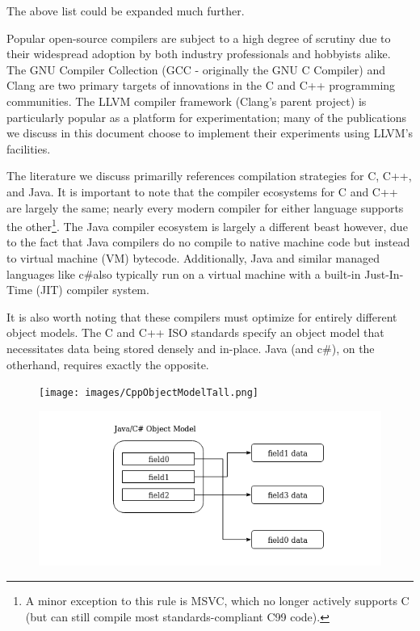 \documentclass[nobib]{tufte-handout}
\newcommand{\csharp}{c\#}
\begin{document}
The above list could be expanded much further.  

Popular open-source compilers are subject to a high degree of scrutiny due to their widespread adoption by both industry professionals and hobbyists alike.  The GNU Compiler Collection (GCC - originally the GNU C Compiler) and Clang are two primary targets of innovations in the C and C++ programming communities.  The LLVM compiler framework (Clang's parent project) is particularly popular as a platform for experimentation; many of the publications we discuss in this document choose to implement their experiments using LLVM's facilities.

The literature we discuss primarilly references compilation strategies for C, C++, and Java.  It is important to note that the compiler ecosystems for C and C++ are largely the same; nearly every modern compiler for either language supports the other\footnote{A minor exception to this rule is MSVC, which no longer actively supports C (but can still compile most standards-compliant C99 code).}.  The Java compiler ecosystem is largely a different beast however, due to the fact that Java compilers do no compile to native machine code but instead to virtual machine (VM) bytecode.  Additionally, Java and similar managed languages like \csharp also typically run on a virtual machine with a built-in Just-In-Time (JIT) compiler system.  

It is also worth noting that these compilers must optimize for entirely different object models.  The C and C++ ISO standards specify an object model that necessitates data being stored densely and in-place.  Java (and \csharp), on the otherhand, requires exactly the opposite.

\begin{figure}
\begin{minipage}{0.5\linewidth}
\texttt{[image: images/CppObjectModelTall.png]}
\end{minipage}
\begin{minipage}{0.5\linewidth}
\includegraphics[width=\linewidth]{images/JavaObjectModel.png}
\end{minipage}
\end{figure}
\end{document}
